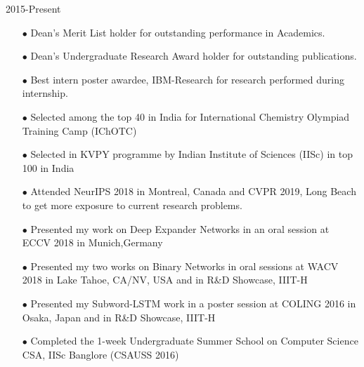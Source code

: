 \documentclass[letterpaper]{page3_formatting} %
\begin{document}
\begin{twenty}
{\begin{enumerate}
    \end{enumerate}
    }{2015-Present}
    
	{
    \begin{enumerate}   
      \item[$\bullet$] Dean's Merit List holder for outstanding performance in Academics.\vspace{0.05cm}
      \item[$\bullet$] Dean's Undergraduate Research Award holder for outstanding publications.\vspace{0.05cm}
       \item[$\bullet$] Best intern poster awardee, IBM-Research for research performed during internship.\vspace{0.05cm}
      \item[$\bullet$] Selected among the top 40 in India for International Chemistry Olympiad Training Camp (IChOTC)\vspace{0.05cm}
      \item[$\bullet$] Selected in KVPY programme by Indian Institute of Sciences (IISc) in top 100 in India
    \end{enumerate}
    }{}
	{
    \begin{enumerate}
    \item[$\bullet$] Attended NeurIPS 2018 in Montreal, Canada and CVPR 2019, Long Beach to get more exposure to current research problems.\vspace{0.05cm}
    \item[$\bullet$] Presented my work on Deep Expander Networks in an oral session at ECCV 2018 in Munich,Germany\vspace{0.05cm}
    \item[$\bullet$] Presented my two works on Binary Networks in oral sessions at WACV 2018 in Lake Tahoe, CA/NV, USA and in R\&D Showcase, IIIT-H\vspace{0.05cm}
      \item[$\bullet$] Presented my Subword-LSTM work in a poster session at COLING 2016 in Osaka, Japan and in R\&D Showcase, IIIT-H\vspace{0.05cm}
      \item[$\bullet$] Completed the 1-week Undergraduate Summer School on Computer Science CSA, IISc Banglore (CSAUSS 2016) \vspace{0.05cm}

\end{enumerate}}
\end{twenty}
\end{document}
